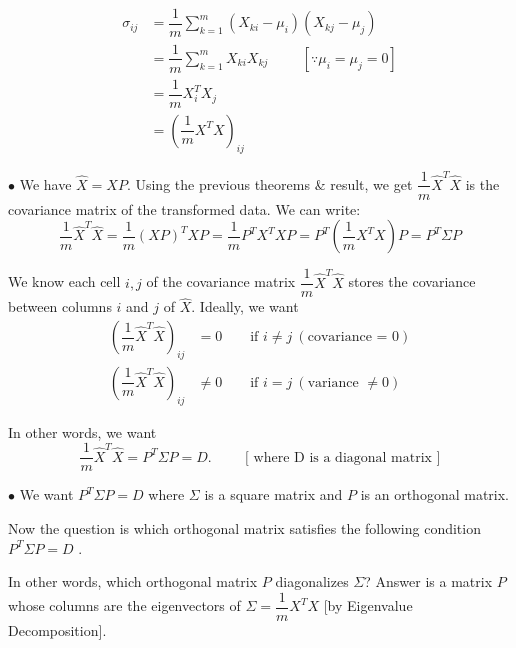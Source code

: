 \documentclass[11pt, a4paper]{article}
\begin{document}
\begin{align*}
\sigma_{ij} &= \dfrac{1}{m} \sum\limits_{k=1}^{m} (X_{ki} - \mu_i)(X_{kj} - \mu_j) \\[0.5em]
&= \dfrac{1}{m} \sum\limits_{k=1}^{m} X_{ki} X_{kj} \hspace{1cm} [\because \mu_i = \mu_j = 0] \\[0.5em]
&= \dfrac{1}{m} X_i^T X_j \\[0.5em]
&= \left( \dfrac{1}{m} X^T X \right)_{ij}
\end{align*}

$\bullet$ We have $\hat{X} = X P$. Using the previous theorems \& result, we get $\dfrac{1}{m} \hat{X}^T \hat{X}$ is the covariance matrix of the transformed data. We can write:
    \[
    \dfrac{1}{m} \hat{X}^T \hat{X} = \dfrac{1}{m} (X P)^T X P = \dfrac{1}{m} P^T X^T X P = P^T \left(\dfrac{1}{m} X^T X\right) P = P^T \Sigma P
    \]
    
We know each cell $i, j$ of the covariance matrix $\dfrac{1}{m} \hat{X}^T \hat{X}$ stores the covariance between columns $i$ and $j$ of $\hat{X}$. Ideally, we want
\begin{align*}
\left(\dfrac{1}{m} \hat{X}^T \hat{X}\right)_{ij} &= 0 \qquad \text{if } i \neq j \ (\text{covariance = 0}) \\
\left(\dfrac{1}{m} \hat{X}^T \hat{X}\right)_{ij} &\neq 0 \qquad \text{if } i = j \ (\text{variance } \neq 0)
\end{align*}
    
In other words, we want
\[
\dfrac{1}{m} \hat{X}^T \hat{X} = P^T \Sigma P = D. \hspace{1cm} \text{[ where D is a diagonal matrix ]}
\]

$\bullet$ We want $P^T \Sigma P = D$ where $\Sigma$ is a square matrix and $P$ is an orthogonal matrix. \\

\vspace{0.3cm}

Now the question is which orthogonal matrix satisfies the following condition $P^T \Sigma P = D $ . \\

\vspace{0.3cm}

In other words, which orthogonal matrix $P$ diagonalizes $\Sigma$? Answer is a matrix $P$ whose columns are the eigenvectors of $\Sigma = \dfrac{1}{m} X^T X$ [by Eigenvalue Decomposition]. \\

\vspace{0.3cm}
\end{document}
